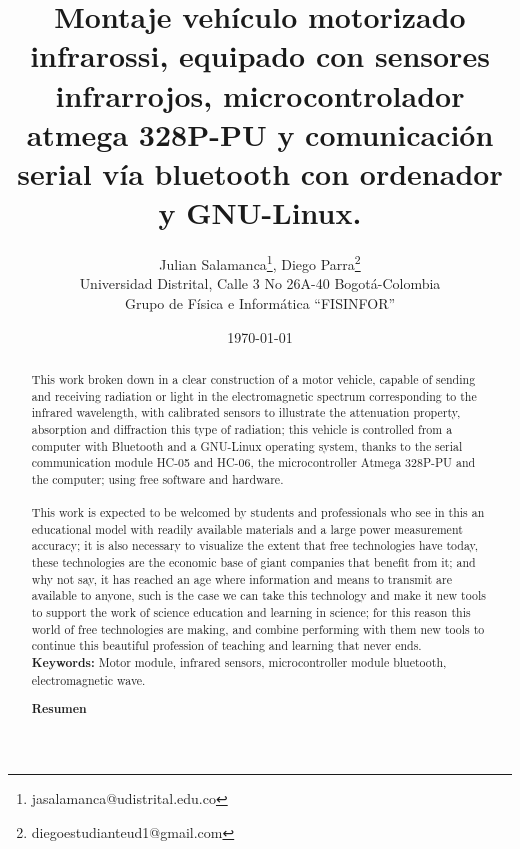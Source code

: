 \documentclass[12]{article}
\title{\bf{Montaje vehículo motorizado infrarossi, equipado con sensores infrarrojos, microcontrolador atmega 328P-PU y comunicación serial vía bluetooth con ordenador y GNU-Linux.}}
\author{Julian Salamanca\footnote{jasalamanca@udistrital.edu.co}, Diego Parra\footnote{diegoestudianteud1@gmail.com} \\
  Universidad Distrital, Calle 3 No 26A-40 Bogotá-Colombia\\
  Grupo de Física e Informática ``FISINFOR''
}
\date{\today}
\def\tablename{Tabla}%
\begin{document}
\renewcommand{\tablename}{Tabla}
\maketitle
\vspace{-0.8cm}

\begin{abstract}
This work broken down in a clear construction of a motor vehicle, capable of sending and receiving radiation or light in the electromagnetic spectrum corresponding to the infrared wavelength, with calibrated sensors to illustrate the attenuation property, absorption and diffraction this type of radiation; this vehicle is controlled from a computer with Bluetooth and a GNU-Linux operating system, thanks to the serial communication module HC-05 and HC-06, the microcontroller Atmega 328P-PU and the computer; using free software and hardware.\\ \\
This work is expected to be welcomed by students and professionals who see in this an educational model with readily available materials and a large power measurement accuracy; it is also necessary to visualize the extent that free technologies have today, these technologies are the economic base of giant companies that benefit from it; and why not say, it has reached an age where information and means to transmit are available to anyone, such is the case we can take this technology and make it new tools to support the work of science education and learning in science; for this reason this world of free technologies are making, and combine performing with them new tools to continue this beautiful profession of teaching and learning that never ends.\\ 
{\bf{Keywords:}} Motor module, infrared sensors, microcontroller module bluetooth, electromagnetic wave.


\begin{center}
{\bf{Resumen}} 
\end{center}


\end{abstract}
\end{document}

